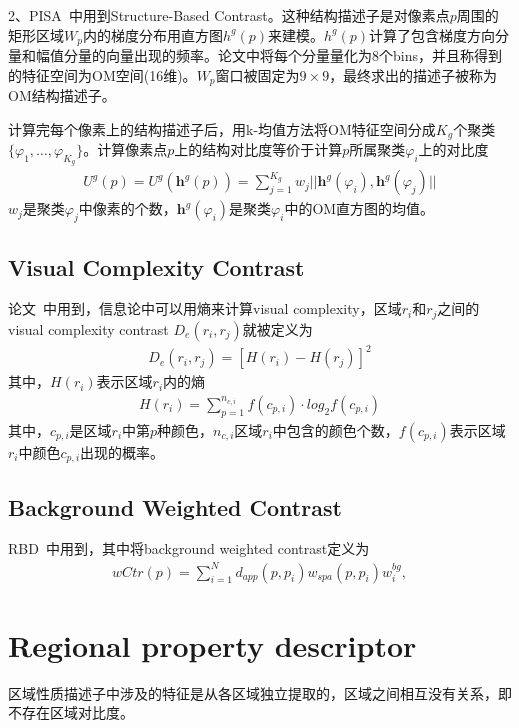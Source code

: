 \documentclass[12pt]{article}
\begin{document}
2、PISA~\cite{shi2013pisa}中用到Structure-Based Contrast。这种结构描述子是对像素点$p$周围的矩形区域$W_p$内的梯度分布用直方图$h^g(p)$来建模。$h^g(p)$计算了包含梯度方向分量和幅值分量的向量出现的频率。论文中将每个分量量化为8个bins，并且称得到的特征空间为OM空间(16维)。$W_p$窗口被固定为$9 \times 9$，最终求出的描述子被称为OM结构描述子。

计算完每个像素上的结构描述子后，用k-均值方法将OM特征空间分成$K_g$个聚类$\{\varphi_1,\ldots,\varphi_{K_g}\}$。计算像素点$p$上的结构对比度等价于计算$p$所属聚类$\varphi_i$上的对比度
\begin{align}
U^g(p) = U^g(\textbf{h}^g(p)) = \sum_{j=1}^{K_g} w_j||\textbf{h}^g(\varphi_i), \textbf{h}^g(\varphi_j)||
\end{align}
$w_j$是聚类$\varphi_j$中像素的个数，$\textbf{h}^g(\varphi_i)$是聚类$\varphi_i$中的OM直方图的均值。

\subsection{Visual Complexity Contrast}

论文~\cite{zhu2014tag}中用到，信息论中可以用熵来计算visual complexity，区域$r_i$和$r_j$之间的visual complexity contrast $D_e(r_i, r_j)$就被定义为
\begin{align}
D_e(r_i, r_j) = [H(r_i)-H(r_j)]^2
\end{align}
其中，$H(r_i)$表示区域$r_i$内的熵
\begin{align}
H(r_i) = \sum_{p=1}^{n_{c, i}}f(c_{p, i})\cdot log_2f(c_{p, i})
\end{align}
其中，$c_{p, i}$是区域$r_i$中第$p$种颜色，$n_{c, i}$区域$r_i$中包含的颜色个数，$f(c_{p, i})$表示区域$r_i$中颜色$c_{p, i}$出现的概率。

\subsection{Background Weighted Contrast}

RBD~\cite{zhu2014saliency}中用到，其中将background weighted contrast定义为
\begin{align}
wCtr(p) = \sum_{i=1}^{N}d_{app}(p, p_i)w_{spa}(p, p_i)w_i^{bg},
\end{align}

\section{Regional property descriptor}

区域性质描述子中涉及的特征是从各区域独立提取的，区域之间相互没有关系，即不存在区域对比度。
\end{document}
